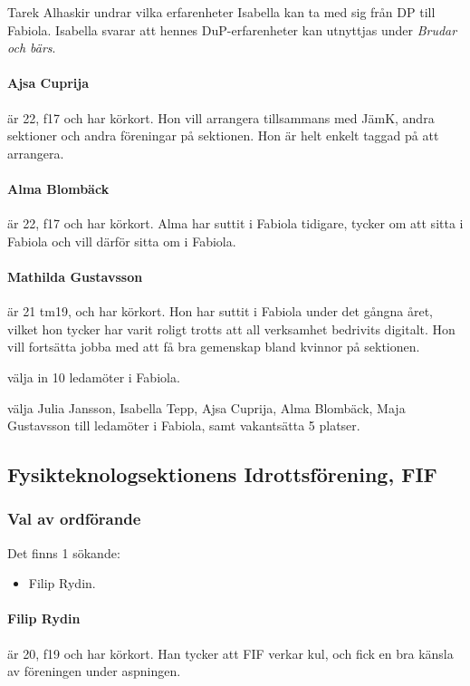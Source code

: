 \documentclass[hidelinks]{sektionsmote}
\begin{document}
Tarek Alhaskir undrar vilka erfarenheter Isabella kan ta med sig från DP till Fabiola.
Isabella svarar att hennes DuP-erfarenheter kan utnyttjas under \textit{Brudar och bärs}.

\paragraph{Ajsa Cuprija} är 22, f17 och har körkort.
Hon vill arrangera tillsammans med JämK, andra sektioner och andra föreningar på sektionen.
Hon är helt enkelt taggad på att arrangera.

\paragraph{Alma Blombäck} är 22, f17 och har körkort.
Alma har suttit i Fabiola tidigare, tycker om att sitta i Fabiola och vill därför sitta om i Fabiola.

\paragraph{Mathilda Gustavsson} är 21 tm19, och har körkort.
Hon har suttit i Fabiola under det gångna året, vilket hon tycker har varit roligt trotts att all verksamhet bedrivits digitalt.
Hon vill fortsätta jobba med att få bra gemenskap bland kvinnor på sektionen.

\begin{beslut}
  \item välja in 10 ledamöter i Fabiola.
  \item välja Julia Jansson, Isabella Tepp, Ajsa Cuprija, Alma Blombäck, Maja Gustavsson till ledamöter i Fabiola, samt vakantsätta 5 platser.
\end{beslut}


\subsection{Fysikteknologsektionens Idrottsförening, FIF}
\subsubsection{Val av ordförande}
Det finns 1 sökande:
\begin{itemize}
    \item Filip Rydin.
\end{itemize}

\paragraph{Filip Rydin} är 20, f19 och har körkort.
Han tycker att FIF verkar kul, och fick en bra känsla av föreningen under aspningen.
\end{document}

